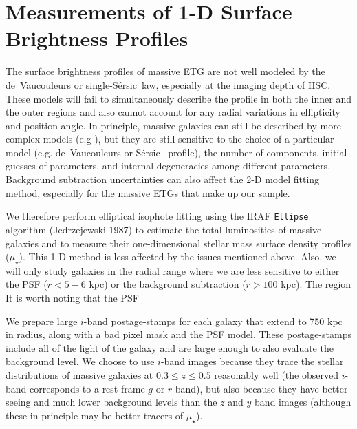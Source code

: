 \documentclass[a4paper,fleqn,usenatbib]{mnras}
\def\ser{{S\'{e}rsic\ }}
\def\mden{{$\mu_{\star}$}}
\begin{document}
\section{Measurements of 1-D Surface Brightness Profiles}
    \label{sec:ellipse}
    
    The surface brightness profiles of massive ETG are not well modeled by the 
    de~Vaucouleurs or single-\ser law, especially at the imaging depth of HSC.
    These models will fail to simultaneously describe the profile in both the inner 
    and the outer regions and also cannot account for any radial variations in 
    ellipticity and position angle. 
    In principle, massive galaxies can still be described by more complex 
    models (e.g \citealt{Huang2013a, Huang2013b, Oh2017}), but they are still 
    sensitive to the choice of a particular model (e.g. de~Vaucouleurs or \ser{} profile), 
    the number of components, initial guesses of parameters, and internal 
    degeneracies among different parameters. 
    Background subtraction uncertainties can also affect the 2-D model fitting method, 
    especially for the massive ETGs that make up our sample. 
    
    We therefore perform elliptical isophote fitting using the IRAF \texttt{Ellipse} 
    algorithm (Jedrzejewski 1987) to estimate the total luminosities of massive 
    galaxies and to measure their one-dimensional stellar mass surface 
    density profiles (\mden{}). 
    This 1-D method is less affected by the issues mentioned above. 
    Also, we will only study galaxies in the radial range where we are less 
    sensitive to either the PSF ($r<5-6$ kpc) or the background subtraction 
    ($r>100$ kpc).
    The region 
    It is worth noting that the PSF  
        
    We prepare large $i$-band postage-stamps for each galaxy that extend to 750 kpc in 
    radius, along with a bad pixel mask and the PSF model. 
    These postage-stamps include all of the light of the galaxy and are large enough to 
    also evaluate the background level. We choose to use $i$-band images because they trace the stellar distributions of 
    massive galaxies at $0.3 \leq z \leq 0.5$ reasonably well 
    (the observed $i$-band corresponds to a rest-frame $g$ or $r$ band), but also 
    because they have better seeing and much lower background levels than the $z$ 
    and $y$ band images (although these in principle may be better tracers of 
    \mden{}). 
    
\end{document}
